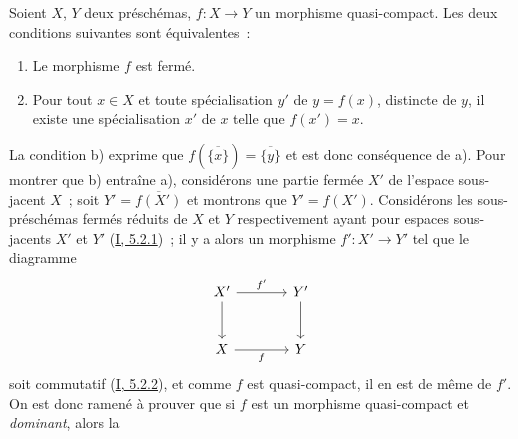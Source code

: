 \begin{proposition}[7.2.1]
\label{II.7.2.1-fr}
Soient $X$, $Y$ deux préschémas, $f:X\to Y$ un morphisme quasi-compact. Les
deux conditions suivantes sont équivalentes~:
\begin{enumerate}
\item[\rm a)] Le morphisme $f$ est fermé.
\item[\rm b)] Pour tout $x\in X$ et toute spécialisation $y'$ de $y=f(x)$,
distincte de $y$, il existe une spécialisation $x'$ de $x$ telle que
$f(x')=x$.
\end{enumerate}
\end{proposition}

La condition b) exprime que $f(\overline{\{x\}})=\overline{\{y\}}$ et est donc
conséquence de a). Pour montrer que b) entraîne a), considérons une partie
fermée $X'$ de l'espace sous-jacent $X$~; soit $Y'=\overline{f(X')}$ et
montrons que $Y'=f(X')$. Considérons les sous-préschémas fermés réduits de
$X$ et $Y$ respectivement ayant pour espaces sous-jacents $X'$ et $Y'$
(\hyperref[I.5.2.1-fr]{I, 5.2.1})~; il y a alors un morphisme $f':X'\to Y'$ tel
que le diagramme
\[
\begin{tikzcd}[column sep=large,row sep=large]
X' \arrow[r,"f'"] \arrow[d] & Y' \arrow[d] \\
X \arrow[r,"f"'] & Y
\end{tikzcd}
\]
soit commutatif (\hyperref[I.5.2.2-fr]{I, 5.2.2}), et comme $f$ est
quasi-compact, il en est de même de $f'$. On est donc ramené à prouver que si
$f$ est un morphisme quasi-compact et \emph{dominant}, alors la
